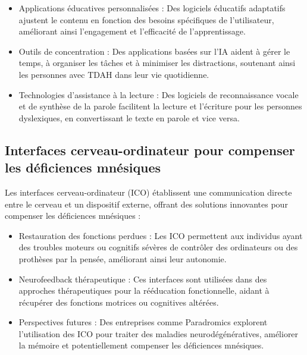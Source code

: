\documentclass[12pt,a4paper]{report}
\begin{document}
\begin{itemize}

    \item Applications éducatives personnalisées : Des logiciels éducatifs adaptatifs ajustent le contenu en fonction des besoins spécifiques de l'utilisateur, améliorant ainsi l'engagement et l'efficacité de l'apprentissage.

    \item Outils de concentration : Des applications basées sur l'IA aident à gérer le temps, à organiser les tâches et à minimiser les distractions, soutenant ainsi les personnes avec TDAH dans leur vie quotidienne.

    \item Technologies d'assistance à la lecture : Des logiciels de reconnaissance vocale et de synthèse de la parole facilitent la lecture et l'écriture pour les personnes dyslexiques, en convertissant le texte en parole et vice versa.
\end{itemize}

\subsection{Interfaces cerveau-ordinateur pour compenser les déficiences mnésiques}

Les interfaces cerveau-ordinateur (ICO) établissent une communication directe entre le cerveau et un dispositif externe, offrant des solutions innovantes pour compenser les déficiences mnésiques :

\begin{itemize}
    \item Restauration des fonctions perdues : Les ICO permettent aux individus ayant des troubles moteurs ou cognitifs sévères de contrôler des ordinateurs ou des prothèses par la pensée, améliorant ainsi leur autonomie. 

    \item Neurofeedback thérapeutique : Ces interfaces sont utilisées dans des approches thérapeutiques pour la rééducation fonctionnelle, aidant à récupérer des fonctions motrices ou cognitives altérées. 

    \item Perspectives futures : Des entreprises comme Paradromics explorent l'utilisation des ICO pour traiter des maladies neurodégénératives, améliorer la mémoire et potentiellement compenser les déficiences mnésiques. 
\end{itemize}
\end{document}
